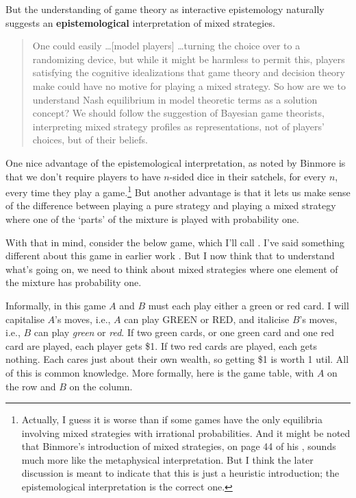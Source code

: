 But the understanding of game theory as interactive epistemology naturally suggests an \textbf{epistemological} interpretation of mixed strategies. %

\begin{quote}One could easily \dots [model players] \dots turning the choice over to a randomizing device, but while it might be harmless to permit this, players satisfying the cognitive idealizations that game theory and decision theory make could have no motive for playing a mixed strategy. So how are we to understand Nash equilibrium in model theoretic terms as a solution concept? We should follow the suggestion of Bayesian game theorists, interpreting mixed strategy profiles as representations, not of players' choices, but of their beliefs. \citep[57-8]{Stalnaker1994}
\end{quote}
One nice advantage of the epistemological interpretation, as noted by Binmore \citeyearpar[185]{Binmore2007} %
is that we don't require players to have $n$-sided dice in their satchels, for every $n$, every time they play a game.\footnote{Actually, I guess it is worse than if some games have the only equilibria involving mixed strategies with irrational probabilities. And it might be noted that Binmore's introduction of mixed strategies, on page 44 of his \citeyearpar{Binmore2007}, sounds much more like the metaphysical interpretation. But I think the later discussion is meant to indicate that this is just a heuristic introduction; the epistemological interpretation is the correct one.} But another advantage is that it lets us make sense of the difference between playing a pure strategy and playing a mixed strategy where one of the `parts' of the mixture is played with probability one. 

With that in mind, consider the below game, which I'll call \RG. I've said something different about this game in earlier work \citep{Weatherson2012-WEAGAT}. But I now think that to understand what's going on, we need to think about mixed strategies where one element of the mixture has probability one.

Informally, in this game $A$ and $B$ must each play either a green or red card. I will capitalise $A$'s moves, i.e., $A$ can play GREEN or RED, and italicise $B$'s moves, i.e., $B$ can play \textit{green} or \textit{red}. If two green cards, or one green card and one red card are played, each player gets \$1. If two red cards are played, each gets nothing. Each cares just about their own wealth, so getting \$1 is worth 1 util. All of this is common knowledge. More formally, here is the game table, with $A$ on the row and $B$ on the column.

